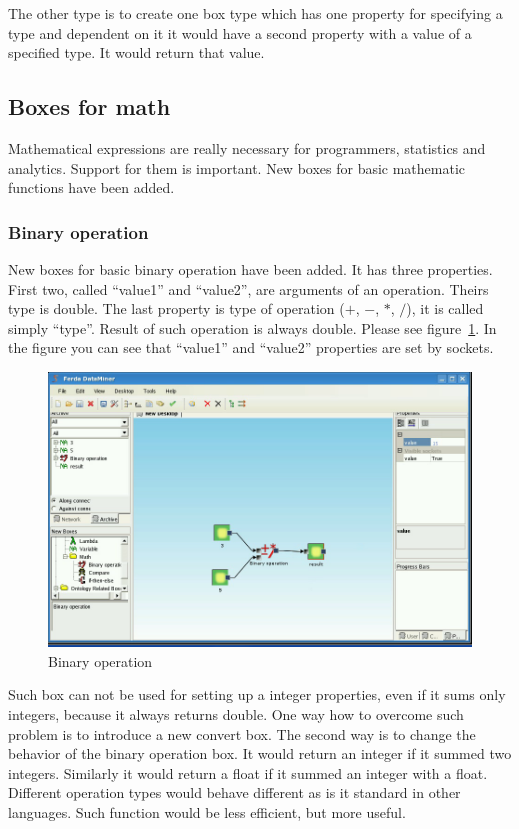 \documentclass[a4paper,12pt]{book}
\begin{document}

The other type is to create one box type which has one property for specifying a type and dependent on it it would have a second property with a value of a specified type. It would return that value.

\subsection{Boxes for math}
Mathematical expressions are really necessary for programmers, statistics and analytics. Support for them is important. New boxes for basic mathematic functions have been added.

\subsubsection{Binary operation}
New boxes for basic binary operation have been added. It has three properties. First two, called ``value1'' and ``value2'', are arguments of an operation. Theirs type is double. The last property is type of operation ($+$, $-$, $*$, $/$), it is called simply ``type''. Result of such operation is always double. Please see figure~\ref{fig:boxBinaryOperation}. In the figure you can see that ``value1'' and ``value2'' properties are set by sockets.
\begin{figure}
	\includegraphics[width=13.72cm]{binaryOperation2.png}
	\caption{Binary operation}
	\label{fig:boxBinaryOperation}
\end{figure}

Such box can not be used for setting up a integer properties, even if it sums only integers, because it always returns double. One way how to overcome such problem is to introduce a new convert box. The second way is to change the behavior of the binary operation box. It would return an integer if it summed two integers. Similarly it would return a float if it summed an integer with a float. Different operation types would behave different as is it standard in other languages. Such function would be less efficient, but more useful.  
\end{document}
